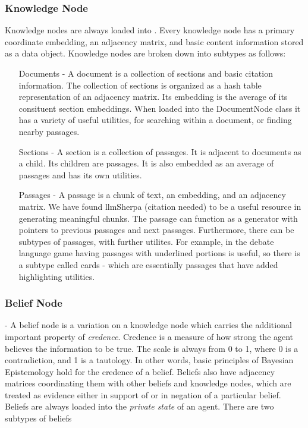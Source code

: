 \subsubsection{Knowledge Node}

Knowledge nodes are always loaded into . Every knowledge node has a primary coordinate embedding, an adjacency matrix, and basic content information stored as a data object. Knowledge nodes are broken down into subtypes as follows:

\begin{itemize}
    \item[Documents] - A document is a collection of sections and basic citation information. The collection of sections is organized as a hash table representation of an adjacency matrix. Its embedding is the average of its consituent section embeddings. When loaded into the DocumentNode class it has a variety of useful utilities, for searching within a document, or finding nearby passages.
    \item[Sections] - A section is a collection of passages. It is adjacent to documents as a child. Its children are passages. It is also embedded as an average of passages and has its own utilities.
    \item[Passages] - A passage is a chunk of text, an embedding, and an adjacency matrix. We have found llmSherpa (citation needed) to be a useful resource in generating meaningful chunks. The passage can function as a generator with pointers to previous passages and next passages. Furthermore, there can be subtypes of passages, with further utilites. For example, in the debate language game having passages with underlined portions is useful, so there is a subtype called cards - which are essentially passages that have added highlighting utilities.
\end{itemize}

\subsubsection{Belief Node} - A belief node is a variation on a knowledge node which carries the additional important property of \textit{credence}. Credence is a measure of how strong the agent believes the information to be true. The scale is always from 0 to 1, where 0 is a contradiction, and 1 is a tautology. In other words, basic principles of Bayesian Epistemology hold for the credence of a belief. Beliefs also have adjacency matrices coordinating them with other beliefs and knowledge nodes, which are treated as evidence either in support of or in negation of a particular belief. Beliefs are always loaded into the \textit{private state} of an agent. There are two subtypes of beliefs

